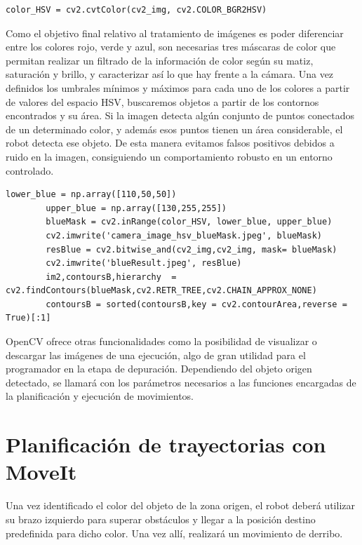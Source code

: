 \documentclass[12pt,spanish,chapterprefix, numbers=noenddot]{book}
\numberwithin{equation}{section}
\numberwithin{figure}{section}
\begin{document}
\vspace{20pt}
	\begin{lstlisting}[frame=single] 
    color_HSV = cv2.cvtColor(cv2_img, cv2.COLOR_BGR2HSV)
	\end{lstlisting}
Como el objetivo final relativo al tratamiento de imágenes es poder diferenciar entre los colores rojo, verde y azul, son necesarias tres máscaras de color que permitan realizar un filtrado de la información de color según su matiz, saturación y brillo, y caracterizar así lo que hay frente a la cámara. 
Una vez definidos los umbrales mínimos y máximos para cada uno de los colores a partir de valores del espacio HSV, buscaremos objetos a partir de los contornos encontrados y su área. Si la imagen detecta algún conjunto de puntos conectados de un determinado color, y además esos puntos tienen un área considerable, el robot detecta ese objeto. De esta manera evitamos falsos positivos debidos a ruido en la imagen, consiguiendo un comportamiento robusto en un entorno controlado. 
\vspace{20pt}
	\begin{lstlisting}[frame=single] 
	    lower_blue = np.array([110,50,50])
        upper_blue = np.array([130,255,255])
        blueMask = cv2.inRange(color_HSV, lower_blue, upper_blue)
        cv2.imwrite('camera_image_hsv_blueMask.jpeg', blueMask)
        resBlue = cv2.bitwise_and(cv2_img,cv2_img, mask= blueMask)
        cv2.imwrite('blueResult.jpeg', resBlue)
        im2,contoursB,hierarchy  = cv2.findContours(blueMask,cv2.RETR_TREE,cv2.CHAIN_APPROX_NONE)
        contoursB = sorted(contoursB,key = cv2.contourArea,reverse = True)[:1] 
	\end{lstlisting}

OpenCV ofrece otras funcionalidades como la posibilidad de visualizar o descargar las imágenes de una ejecución, algo de gran utilidad para el programador en la etapa de depuración. 
Dependiendo del objeto origen detectado, se llamará con los parámetros necesarios a las funciones encargadas de la planificación y ejecución de movimientos.

\section{Planificación de trayectorias con MoveIt}
Una vez identificado el color del objeto de la zona origen, el robot deberá utilizar su brazo izquierdo para superar obstáculos y llegar a la posición destino predefinida para dicho color. Una vez allí, realizará un movimiento de derribo. 
\end{document}
